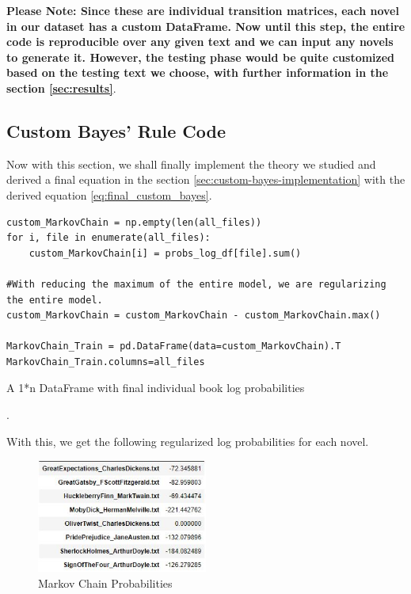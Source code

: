 \textbf{Please Note: Since these are individual transition matrices, each novel in our dataset has a custom DataFrame. Now until this step, the entire code is reproducible over any given text and we can input any novels to generate it. However, the testing phase would be quite customized based on the testing text we choose, with further information in the section \ref{sec:results}}. 

\subsection{Custom Bayes' Rule Code}
\label{sec:code-custom-bayes-markov}

Now with this section, we shall finally implement the theory we studied and derived a final equation in the section \ref{sec:custom-bayes-implementation} with the derived equation \ref{eq:final_custom_bayes}.
\vspace{0.5cm}

\begin{code}
\label{code:final-custom-bayes}
\begin{verbatim}
custom_MarkovChain = np.empty(len(all_files))
for i, file in enumerate(all_files):
    custom_MarkovChain[i] = probs_log_df[file].sum()
    
#With reducing the maximum of the entire model, we are regularizing the entire model.
custom_MarkovChain = custom_MarkovChain - custom_MarkovChain.max()

MarkovChain_Train = pd.DataFrame(data=custom_MarkovChain).T
MarkovChain_Train.columns=all_files    
\end{verbatim}
\caption{A 1*n DataFrame with final individual book log probabilities}.
\end{code}

With this, we get the following regularized log probabilities for each novel.

\begin{figure}[H]
	\begin{center}
		\includegraphics[width = 0.5\textwidth]{Images/markovchain_custom.JPG} %
		\caption{Markov Chain Probabilities}
		\label{fig:custom-markov-chain-probs-final}
	\end{center}
\end{figure}


